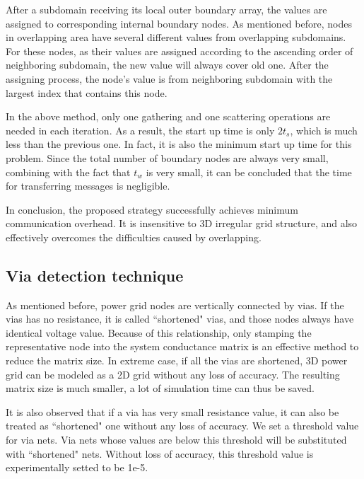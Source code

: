\documentclass{sig-alternate}
\begin{document}
	After a subdomain receiving its local outer boundary array, the values are assigned to corresponding internal boundary 
	nodes. As 
	mentioned before, nodes in overlapping area have several different values from overlapping subdomains. For these nodes, 
	as their values are assigned according to the ascending order of neighboring subdomain, the new value will always cover old one. 
	After the assigning process, the node's value is from neighboring subdomain with the largest index that contains this node.  
	
	In the above method, only one gathering and one scattering operations are needed in each iteration. As a result, the start up time 
	is only $2t_s$, which is much less than the previous one. In fact, it is also the minimum 
	start up time for this problem. Since the total number 
	of boundary nodes are always very small, combining with the fact that $t_w$ is very small, it can be concluded that the 
	time for transferring messages is negligible. 

	In conclusion, the proposed strategy successfully achieves minimum communication overhead. It is insensitive to 3D irregular 
	grid structure, and also effectively overcomes the difficulties caused by overlapping.	
  \subsection{Via detection technique}
	As mentioned before, power grid nodes are vertically connected by vias. If the vias has no 
	resistance, it is called ``shortened" vias, and those nodes always have identical voltage value. Because of this relationship, 
	only stamping the representative
	node into the system conductance matrix is an effective method to reduce the matrix size. In extreme case, if all the
	vias are shortened, 3D power grid can be modeled as a 2D grid without any loss of accuracy. The resulting matrix size
	is much smaller, a lot of simulation time can thus be saved. 
 
	It is also observed that if a via has very small resistance value, it can also be treated as ``shortened" one 
	without any loss of accuracy. We set a threshold value for via nets. Via nets 
	whose values are below this threshold will be substituted with ``shortened" nets. Without loss of accuracy, this threshold value 
	is experimentally setted to be 1e-5. 
\end{document}
